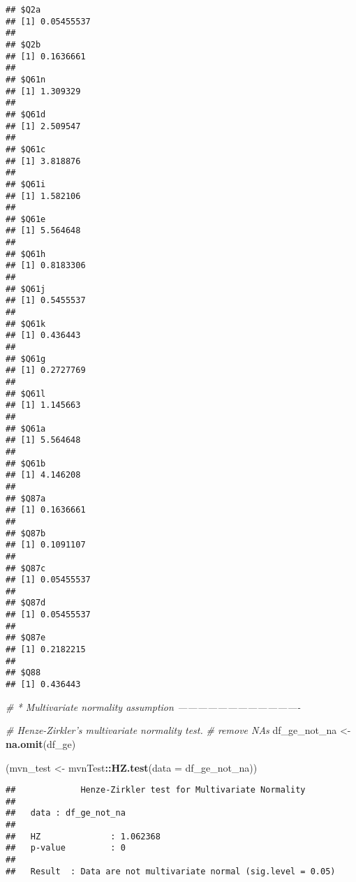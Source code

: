 \documentclass[
]{article}
\newenvironment{Shaded}{\begin{snugshade}}{\end{snugshade}}
\newcommand{\CommentTok}[1]{\textcolor[rgb]{0.56,0.35,0.01}{\textit{#1}}}
\newcommand{\DataTypeTok}[1]{\textcolor[rgb]{0.13,0.29,0.53}{#1}}
\newcommand{\KeywordTok}[1]{\textcolor[rgb]{0.13,0.29,0.53}{\textbf{#1}}}
\newcommand{\NormalTok}[1]{#1}
\newcommand{\OperatorTok}[1]{\textcolor[rgb]{0.81,0.36,0.00}{\textbf{#1}}}
\newcommand{\StringTok}[1]{\textcolor[rgb]{0.31,0.60,0.02}{#1}}
\begin{document}
\begin{verbatim}
## $Q2a
## [1] 0.05455537
## 
## $Q2b
## [1] 0.1636661
## 
## $Q61n
## [1] 1.309329
## 
## $Q61d
## [1] 2.509547
## 
## $Q61c
## [1] 3.818876
## 
## $Q61i
## [1] 1.582106
## 
## $Q61e
## [1] 5.564648
## 
## $Q61h
## [1] 0.8183306
## 
## $Q61j
## [1] 0.5455537
## 
## $Q61k
## [1] 0.436443
## 
## $Q61g
## [1] 0.2727769
## 
## $Q61l
## [1] 1.145663
## 
## $Q61a
## [1] 5.564648
## 
## $Q61b
## [1] 4.146208
## 
## $Q87a
## [1] 0.1636661
## 
## $Q87b
## [1] 0.1091107
## 
## $Q87c
## [1] 0.05455537
## 
## $Q87d
## [1] 0.05455537
## 
## $Q87e
## [1] 0.2182215
## 
## $Q88
## [1] 0.436443
\end{verbatim}

\begin{Shaded}
\begin{Highlighting}[]
\CommentTok{# * Multivariate normality assumption -------------------------------------}

\CommentTok{# Henze-Zirkler’s multivariate normality test.}
\CommentTok{# remove NAs}
\NormalTok{df_ge_not_na <-}\StringTok{ }\KeywordTok{na.omit}\NormalTok{(df_ge)}

\NormalTok{(mvn_test <-}\StringTok{ }\NormalTok{mvnTest}\OperatorTok{::}\KeywordTok{HZ.test}\NormalTok{(}\DataTypeTok{data =}\NormalTok{ df_ge_not_na))}
\end{Highlighting}
\end{Shaded}

\begin{verbatim}
##             Henze-Zirkler test for Multivariate Normality 
## 
##   data : df_ge_not_na 
## 
##   HZ              : 1.062368 
##   p-value         : 0 
## 
##   Result  : Data are not multivariate normal (sig.level = 0.05)
\end{verbatim}
\end{document}
